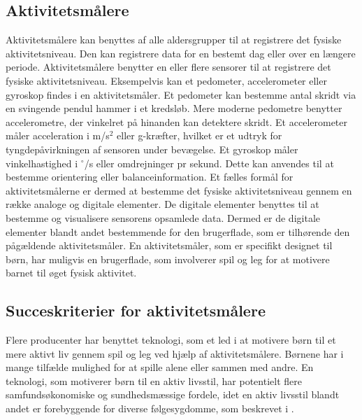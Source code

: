 \subsection{Aktivitetsmålere}
Aktivitetsmålere kan benyttes af alle aldersgrupper til at registrere det fysiske aktivitetsniveau. Den kan registrere data for en bestemt dag eller over en længere periode. Aktivitetsmålere benytter en eller flere sensorer til at registrere det fysiske aktivitetsniveau. Eksempelvis kan et pedometer, accelerometer eller gyroskop findes i en aktivitetsmåler. Et pedometer kan bestemme antal skridt via en svingende pendul hammer i et kredsløb. Mere moderne pedometre benytter accelerometre, der vinkelret på hinanden kan detektere skridt. Et accelerometer måler acceleration i m/s$^2$ eller g-kræfter, hvilket er et udtryk for tyngdepåvirkningen af sensoren under bevægelse. Et gyroskop måler vinkelhastighed i $^\circ$/s eller omdrejninger pr sekund. Dette kan anvendes til at bestemme orientering eller balanceinformation. \citep{Sparkfun,Woodford2016,Sparkfun_gyro} \newline
Et fælles formål for aktivitetsmålerne er dermed at bestemme det fysiske aktivitetsniveau gennem en række analoge og digitale elementer. De digitale elementer benyttes til at bestemme og visualisere sensorens opsamlede data. Dermed er de digitale elementer blandt andet bestemmende for den brugerflade, som er tilhørende den pågældende aktivitetsmåler. En aktivitetsmåler, som er specifikt designet til børn, har muligvis en brugerflade, som involverer spil og leg for at motivere barnet til øget fysisk aktivitet. 

\subsection{Succeskriterier for aktivitetsmålere} \label{succeskrav}
Flere producenter har benyttet teknologi, som et led i at motivere børn til et mere aktivt liv gennem spil og leg ved hjælp af aktivitetsmålere. Børnene har i mange tilfælde mulighed for at spille alene eller sammen med andre. %
\citep{Fuhu2015,PowerAbout2015} %
En teknologi, som motiverer børn til en aktiv livsstil, har potentielt flere samfundsøkonomiske og sundhedsmæssige fordele, idet en aktiv livsstil blandt andet er forebyggende for diverse følgesygdomme, som beskrevet i .

